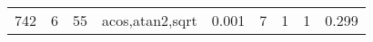 \begin{table}[h!]
\begin{center}
\begin{tabular}{|l||r|r|r||r|r|r|r|r|}
742 & 6 & 55 & acos,atan2,sqrt & 0.001 & 7 & 1 & 1 & 0.299 \\

\end{tabular}
\end{center}
\end{table}
